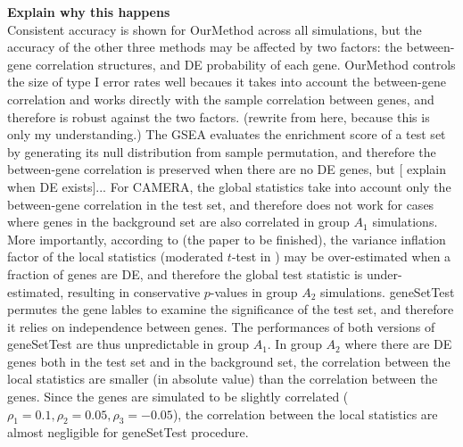 \documentclass[11pt, a4paper]{article}
\begin{document}
		 
		 \textbf{Explain why this happens}\\
		Consistent accuracy is shown for OurMethod across all simulations, but the accuracy of the other three methods may be affected by two factors: the between-gene correlation structures, and DE probability of each gene. OurMethod controls the size of type I error rates well becaues it takes into account the between-gene correlation and works directly with the sample correlation between genes, and therefore is robust against the two factors. (rewrite from here, because this is only my understanding.)  The GSEA evaluates the enrichment score of a test set by generating its null distribution from sample permutation, and therefore the between-gene correlation is preserved when there are no DE genes, but [ explain when DE exists]... 
		For CAMERA, the global statistics take into account only the between-gene correlation in the test set, and therefore does not work for cases where genes in the background set are also correlated in group $A_1$ simulations. More importantly, according to (the paper to be finished), the variance inflation factor of the local statistics (moderated $t$-test in \cite{wu2012camera}) may be over-estimated when a fraction of genes are DE, and therefore the global test statistic is under-estimated, resulting in conservative $p$-values in group $A_2$ simulations. geneSetTest permutes the gene lables to examine the significance of the test set, and therefore it relies on independence between genes. The performances of both versions of geneSetTest are thus unpredictable in group $A_1$. In group $A_2$ where there are DE genes both in the test set and in the background set, the correlation between the local statistics are smaller (in absolute value) than the correlation between the genes. Since the genes are simulated to be slightly correlated ($\rho_1=0.1, \rho_2 = 0.05, \rho_3 = -0.05$), the correlation between the local statistics are almost negligible for geneSetTest procedure. 
			
\end{document}
